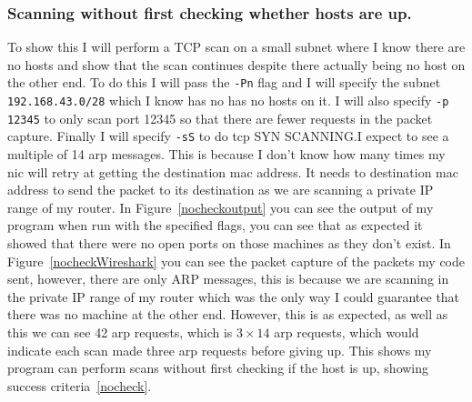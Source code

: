 \documentclass[titlepage]{article}
\let\Oldsubsubsection\subsubsection{}
\renewcommand{\subsubsection}{\FloatBarrier\Oldsubsubsection}
\begin{document}
\subsubsection{Scanning without first checking whether hosts are up.}
To show this I will perform a TCP scan on a small subnet where I
know there are no hosts and show that the scan continues despite there actually
being no host on the other end. To do this I will pass the \verb|-Pn| flag
and I will specify the subnet \verb|192.168.43.0/28| which I know has no has no hosts
on it. I will also specify \verb|-p 12345| to only scan port 12345 so that there are
fewer requests in the packet capture. Finally I will specify \verb|-sS| to do \gls{tcp}
SYN SCANNING.\@ I expect to see a multiple of 14 \gls{arp} messages.
This is because I don't know how many times my \gls{nic} will retry at getting
the destination \gls{mac} address. It needs to destination \gls{mac} address to send
the packet to its destination as we are scanning a private IP range of my router.
In Figure~\ref{nocheckoutput} you can see the output of my program when run with the
specified flags, you can see that as expected it showed that there were no open ports
on those machines as they don't exist. In Figure~\ref{nocheckWireshark} you can see the
packet capture of the packets my code sent, however, there are only ARP messages, this is
because we are scanning in the private IP range of my router which was the only
way I could guarantee that there was no machine at the other end. However, this is
as expected, as well as this we can see 42 \gls{arp} requests, which is $3\times14$
\gls{arp} requests, which would indicate each scan made three \gls{arp} requests before
giving up. This shows my program can perform scans without first checking if the host is
up, showing success criteria~\ref{nocheck}.
\end{document}

